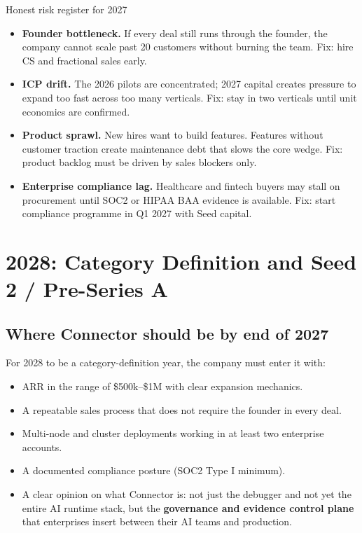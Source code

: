 \begin{warnbox}{Honest risk register for 2027}
\begin{itemize}[noitemsep,leftmargin=1.4em]
  \item \textbf{Founder bottleneck.} If every deal still runs through the
        founder, the company cannot scale past 20 customers without burning
        the team. Fix: hire CS and fractional sales early.
  \item \textbf{ICP drift.} The 2026 pilots are concentrated; 2027 capital
        creates pressure to expand too fast across too many verticals. Fix:
        stay in two verticals until unit economics are confirmed.
  \item \textbf{Product sprawl.} New hires want to build features. Features
        without customer traction create maintenance debt that slows the core
        wedge. Fix: product backlog must be driven by sales blockers only.
  \item \textbf{Enterprise compliance lag.} Healthcare and fintech buyers may
        stall on procurement until SOC2 or HIPAA BAA evidence is available. Fix:
        start compliance programme in Q1 2027 with Seed capital.
\end{itemize}
\end{warnbox}

\section{2028: Category Definition and Seed 2 / Pre-Series A}

\subsection{Where Connector should be by end of 2027}

For 2028 to be a category-definition year, the company must enter it with:

\begin{itemize}[leftmargin=1.5em,itemsep=3pt]
  \item ARR in the range of \$500k--\$1M with clear expansion mechanics.
  \item A repeatable sales process that does not require the founder in every
        deal.
  \item Multi-node and cluster deployments working in at least two enterprise
        accounts.
  \item A documented compliance posture (SOC2 Type I minimum).
  \item A clear opinion on what Connector is: not just the debugger and not
        yet the entire AI runtime stack, but the \textbf{governance and evidence
        control plane} that enterprises insert between their AI teams and
        production.
\end{itemize}

